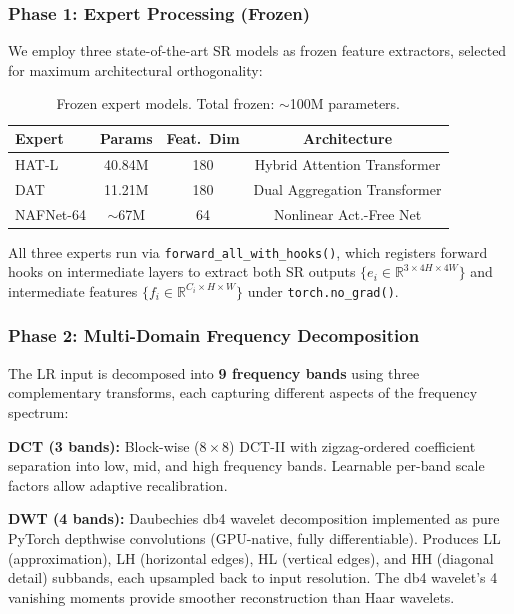 \documentclass[10pt,twocolumn,letterpaper]{article}
\begin{document}
\subsubsection{Phase 1: Expert Processing (Frozen)}

We employ three state-of-the-art SR models as frozen feature extractors, selected for maximum architectural orthogonality:

\begin{table}[h]
\centering
\small
\begin{tabular}{@{}lccc@{}}
\toprule
\textbf{Expert} & \textbf{Params} & \textbf{Feat.\ Dim} & \textbf{Architecture} \\
\midrule
HAT-L \cite{hat} & 40.84M & 180 & Hybrid Attention Transformer \\
DAT \cite{dat} & 11.21M & 180 & Dual Aggregation Transformer \\
NAFNet-64 \cite{nafnet} & $\sim$67M & 64 & Nonlinear Act.-Free Net \\
\bottomrule
\end{tabular}
\caption{Frozen expert models. Total frozen: $\sim$100M parameters.}
\label{tab:experts}
\end{table}

All three experts run via \texttt{forward\_all\_with\_hooks()}, which registers forward hooks on intermediate layers to extract both SR outputs $\{e_i \in \mathbb{R}^{3 \times 4H \times 4W}\}$ and intermediate features $\{f_i \in \mathbb{R}^{C_i \times H \times W}\}$ under \texttt{torch.no\_grad()}.

\subsubsection{Phase 2: Multi-Domain Frequency Decomposition}

The LR input is decomposed into \textbf{9 frequency bands} using three complementary transforms, each capturing different aspects of the frequency spectrum:

\noindent\textbf{DCT (3 bands):} Block-wise ($8\times 8$) DCT-II with zigzag-ordered coefficient separation into low, mid, and high frequency bands. Learnable per-band scale factors allow adaptive recalibration.

\noindent\textbf{DWT (4 bands):} Daubechies db4 wavelet decomposition implemented as pure PyTorch depthwise convolutions (GPU-native, fully differentiable). Produces LL (approximation), LH (horizontal edges), HL (vertical edges), and HH (diagonal detail) subbands, each upsampled back to input resolution. The db4 wavelet's 4 vanishing moments provide smoother reconstruction than Haar wavelets.
\end{document}
